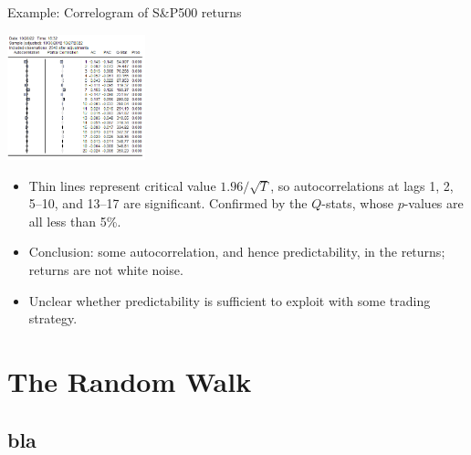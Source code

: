 \begin{frame}
\begin{block}{Example: Correlogram of S\&P500 returns}
\begin{center}
\includegraphics[width=0.3\textwidth]{correlogram}
\end{center}

\end{block}
\begin{itemize}
\item Thin lines represent critical value $1.96 / \sqrt{T}$, so autocorrelations at lags 1, 2, 5--10, and 13--17 are significant. Confirmed by the $Q$-stats, whose $p$-values are all less than 5\%.
\item Conclusion: some autocorrelation, and hence predictability, in the returns; returns are not white noise.
\item Unclear whether predictability is sufficient to exploit with some trading strategy.
\end{itemize}
\end{frame}



\section{The Random Walk}\subsection*{bla}

